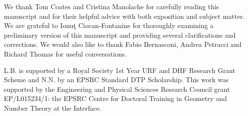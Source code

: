 \begin{acknowledgements} We thank Tom Coates and Cristina Manolache for carefully reading this manuscript and for their helpful advice with both exposition and subject matter. We are grateful to Ionu\c{t} Ciocan-Fontanine for thoroughly examining a preliminary version of this manuscript and providing several clarifications and corrections. We would also like to thank Fabio Bernasconi, Andrea Petracci and Richard Thomas for useful conversations. 

L.B. is supported by a Royal Society 1st Year URF and DHF Research Grant Scheme and N.N. by an EPSRC Standard DTP Scholarship.
This work was supported by the Engineering and Physical Sciences Research Council grant EP/L015234/1: the EPSRC Centre for Doctoral Training in Geometry and Number Theory at the Interface.
\end{acknowledgements}
